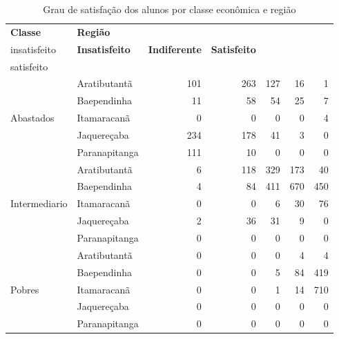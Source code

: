 \begin{table}[h]
\footnotesize
\centering
\caption{Grau de satisfação dos alunos por classe econômica e região}
\label{tabela:q16}
\vspace{0.5em}
\begin{tabular}{ll rrrrr}
  \toprule
 \textbf{Classe}        & \textbf{Região}  & \textbf{\specialcell{c}{Muito\\insatisfeito}} & \textbf{Insatisfeito} & \textbf{Indiferente} & \textbf{Satisfeito} & \textbf{\specialcell{c}{Muito\\satisfeito}} \\ 
   \midrule
			& Aratibutantã            &                101 &          263 &         127 &         16 &                1 \\ 
                & Baependinha             &                 11 &           58 &          54 &         25 &                7 \\ 
	Abastados       & Itamaracanã             &                  0 &            0 &           0 &          0 &                4 \\ 
                & Jaquereçaba             &                234 &          178 &          41 &          3 &                0 \\ 
                & Paranapitanga           &                111 &           10 &           0 &          0 &                0 \\ 
\midrule
			& Aratibutantã            &                  6 &          118 &         329 &        173 &               40 \\ 
                & Baependinha             &                  4 &           84 &         411 &        670 &              450 \\ 
	Intermediario & Itamaracanã             &                  0 &            0 &           6 &         30 &               76 \\ 
                & Jaquereçaba             &                  2 &           36 &          31 &          9 &                0 \\ 
                & Paranapitanga           &                  0 &            0 &           0 &          0 &                0 \\ 
\midrule
			& Aratibutantã            &                  0 &            0 &           0 &          4 &                4 \\ 
                & Baependinha             &                  0 &            0 &           5 &         84 &              419 \\ 
	Pobres        & Itamaracanã             &                  0 &            0 &           1 &         14 &              710 \\ 
                & Jaquereçaba             &                  0 &            0 &           0 &          0 &                0 \\ 
                & Paranapitanga           &                  0 &            0 &           0 &          0 &                0 \\ 
   \bottomrule
\end{tabular}
\end{table}

